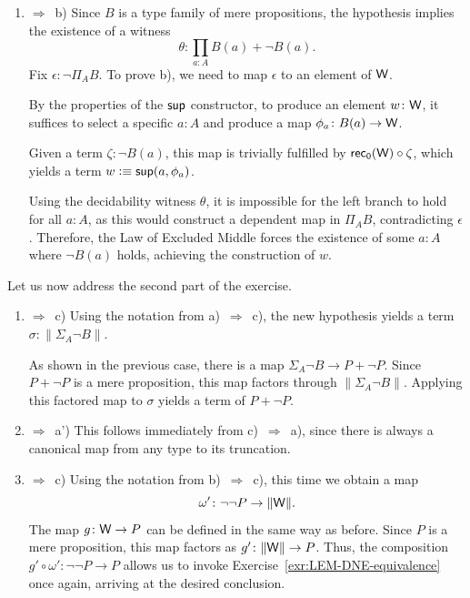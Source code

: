 \begin{solution}
\begin{enumerate}
        \item[c)] $\Rightarrow$~b) Since $B$ is a type family of mere propositions, the hypothesis implies the existence of a witness
        \[
            \theta\colon\prod_{a\colon A}B(a)+\neg B(a).
        \]
        Fix $\epsilon\colon\neg\Pi_AB$. To prove b), we need to map $\epsilon$ to an element of $\mathsf{W}$.
        
        By the properties of the $\mathsf{sup}$ constructor, to produce an element $w\colon\fun W$, it suffices to select a specific $a\colon A$ and produce a map $\phi_a\colon B(a)\to\fun W$.
        
        Given a term $\zeta\colon\neg B(a)$, this map is trivially fulfilled by $\mathsf{rec}_{\mathsf{0}}(\mathsf{W})\circ\zeta$, which yields a term $w\mathrel{\vcentcolon}\equiv\mathsf{sup}(a, \phi_a)$.
        
        Using the decidability witness $\theta$, it is impossible for the left branch to hold for all $a\colon A$, as this would construct a dependent map in $\Pi_AB$, contradicting $\epsilon$. Therefore, the Law of Excluded Middle forces the existence of some $a\colon A$ where $\neg B(a)$ holds, achieving the construction of $w$.
    \end{enumerate}

    Let us now address the second part of the exercise.

    \begin{enumerate}
        \item[a')] $\Rightarrow$~c) Using the notation from a)~$\Rightarrow$~c), the new hypothesis yields a term $\sigma\colon\lVert\Sigma_A\neg B\rVert$.
        
        As shown in the previous case, there is a map $\Sigma_A\neg B\to P+\neg P$. Since $P+\neg P$ is a mere proposition, this map factors through $\lVert\Sigma_A\neg B\rVert$. Applying this factored map to $\sigma$ yields a term of $P+\neg P$.

        \item[c)] $\Rightarrow$~a') This follows immediately from c)~$\Rightarrow$~a), since there is always a canonical map from any type to its truncation.

        \item[b')] $\Rightarrow$~c) Using the notation from b)~$\Rightarrow$~c), this time we obtain a map
        \[
            \omega'\colon\neg\neg P\to\lVert\fun W\rVert.
        \]
        The map $g\colon\fun W\to P$ can be defined in the same way as before. Since $P$ is a mere proposition, this map factors as $g'\colon\lVert\fun W\rVert\to P$. Thus, the composition $g'\circ\omega'\colon\neg\neg P\to P$ allows us to invoke Exercise~\ref{exr:LEM-DNE-equivalence} once again, arriving at the desired conclusion.


\end{enumerate}
\end{solution}
